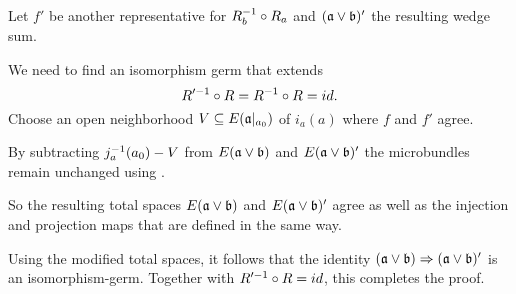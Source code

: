 \begin{myproof}
\begin{enumerate}
        Let $f'$ be another representative for $R_b^{-1} \circ R_a$ and $(\mathfrak{a} \vee \mathfrak{b})'$ the resulting wedge sum.
        
        We need to find an isomorphism germ that extends
        \[ R'^{-1} \circ R = R^{-1} \circ R = id. \]
        Choose an open neighborhood $V \subseteq{} E(\mathfrak{a}\vert_{a_0})$ of $i_a(a)$ where $f$ and $f'$ agree.
        
        By subtracting $j_a^{-1}(a_0) - V$ from $E(\mathfrak{a} \vee \mathfrak{b})$ and $E(\mathfrak{a} \vee \mathfrak{b})'$
        the microbundles remain unchanged using .
        
        So the resulting total spaces $E(\mathfrak{a} \vee \mathfrak{b})$ and $E(\mathfrak{a} \vee \mathfrak{b})'$ agree
        as well as the injection and projection maps that are defined in the same way.
        
        Using the modified total spaces,
        it follows that the identity $(\mathfrak{a} \vee \mathfrak{b}) \Rightarrow{} (\mathfrak{a} \vee \mathfrak{b})'$
        is an isomorphism-germ.
        Together with $R'^{-1} \circ R = id$, this completes the proof.
    \end{enumerate}
\end{myproof}